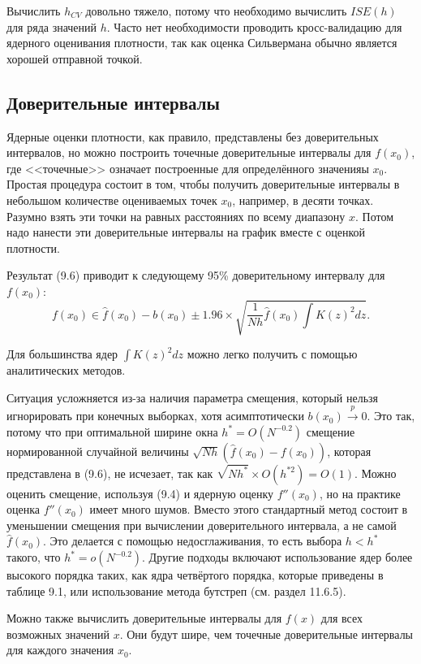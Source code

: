 Вычислить $h_{CV}$ довольно тяжело, потому что необходимо вычислить $ISE(h)$ для ряда значений $h$. Часто нет необходимости проводить кросс-валидацию для ядерного оценивания плотности, так как оценка Сильвермана обычно является хорошей отправной точкой.

\subsection{Доверительные интервалы}

Ядерные оценки плотности, как правило, представлены без доверительных интервалов, но можно построить точечные доверительные интервалы для $f(x_0)$, где <<точечные>> означает построенные для определённого значенияы $x_0$. Простая процедура состоит в том, чтобы получить доверительные интервалы в небольшом количестве оцениваемых точек $x_0$, например, в десяти точках. Разумно взять эти точки на равных расстояниях по всему диапазону $x$. Потом надо нанести эти доверительные интервалы на график вместе с оценкой  плотности.

Результат (9.6) приводит к следующему 95\% доверительному интервалу для $f(x_0)$:
\[
f(x_0) \in \hat{f}(x_0) - b(x_0) \pm 1.96 \times \sqrt{\frac{1}{Nh}\hat{f}(x_0)\int K(z)^2dz}.
\]

Для большинства ядер $\int K(z)^2dz$ можно легко получить с помощью аналитических методов.

Ситуация усложняется из-за наличия параметра смещения, который нельзя игнорировать при конечных выборках, хотя асимптотически $b(x_0) \stackrel{p}{\rightarrow} 0$. Это так, потому что при оптимальной ширине окна $h^* = O(N^{-0.2})$ смещение нормированной случайной величины $\sqrt{Nh}(\hat{f}(x_0) - f(x_0))$, которая представлена в (9.6), не исчезает, так как $\sqrt{Nh^*} \times O(h^{*2}) = O(1)$. Можно оценить смещение, используя (9.4) и ядерную оценку $f''(x_0)$, но на практике оценка $f''(x_0)$ имеет много шумов. Вместо этого стандартный метод
состоит в уменьшении смещения при вычислении доверительного интервала, а не самой $\hat{f}(x_0)$. Это делается с помощью недосглаживания, то есть выбора $h < h^*$ такого, что $h^* = o(N^{-0.2})$. Другие подходы включают использование ядер более высокого порядка таких, как ядра четвёртого порядка, которые приведены в таблице 9.1, или использование метода бутстреп (см. раздел 11.6.5).

Можно также вычислить доверительные интервалы для $f(x)$ для всех возможных значений $x$. Они будут шире, чем точечные доверительные интервалы для каждого значения $x_0$.

